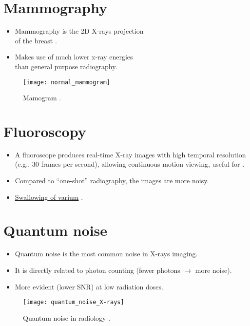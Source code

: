 \section{Mammography}
\begin{itemize}
\item Mammography is the 2D X-rays projection\\ of the breast
  \cite{bushberg2011essential}.
\item Makes use of much lower x-ray energies\\ than general purpose
  radiography.
\end{itemize}
\vspace{-18ex}
\begin{figure}[!h]
  \begin{flushright}
    \texttt{[image: normal\_mammogram]}
    \end{flushright}
    \caption{Mamogram \cite{CDC_mammograms}.\label{fig:mamogram}}
\end{figure}

\section{Fluoroscopy}
\begin{itemize}
\item A fluoroscope produces real-time X-ray images with high temporal
  resolution (e.g., 30 frames per second), allowing continuous motion
  viewing, useful for 
  \cite{bushberg2011essential}.
\item Compared to ``one-shot'' radiography, the images are more noisy.
\item
  \href{https://en.wikipedia.org/wiki/Fluoroscopy#/media/File:Normal_barium_swallow_animation.gif}{Swallowing
    of varium} \cite{Wikipedia_Fluoroscopy}.
\end{itemize}

\section{Quantum noise}
\begin{itemize}
\item Quantum noise is the most common noise in X-rays imaging.
\item It is directly related to photon counting (fewer photons
  $\rightarrow$ more noise).
\item More evident (lower \gls{SNR}) at low radiation doses.
\end{itemize}
\vspace{-1ex}
\begin{figure}[!h]
  \centering
    \texttt{[image: quantum\_noise\_X-rays]}
    \caption{Quantum noise in radiology
      \cite{CHANDRA2020107426}.\label{fig:quantum_noise_X-rays}}
\end{figure}

